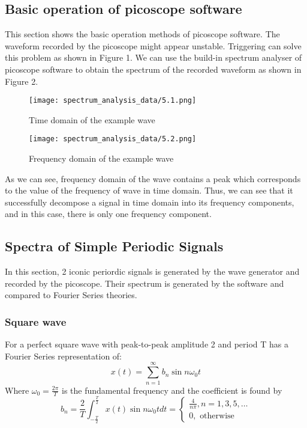 \documentclass[12pt]{article}[times]
\begin{document}
\subsection{Basic operation of picoscope software}
This section shows the basic operation methods of picoscope software. 
The waveform recorded by the picoscope might appear unstable. Triggering
can solve this problem as shown in Figure 1.
We can use the build-in spectrum analyser of picoscope software to 
obtain the spectrum of the recorded waveform as shown in Figure 2.
\noindent %
\begin{figure}[h]
  \centering
  \begin{minipage}{0.45\textwidth}
    \texttt{[image: spectrum\_analysis\_data/5.1.png]}
    \caption{Time domain of the example wave}
    \label{fig:image1}
  \end{minipage}
  \hfill %
  \begin{minipage}{0.45\textwidth}
    \texttt{[image: spectrum\_analysis\_data/5.2.png]}
    \caption{Frequency domain of the example wave}
    \label{fig:image2}
  \end{minipage}
\end{figure}
\newline
As we can see, frequency domain of the wave contains a peak which corresponds
to the value of the frequency of wave in time domain. 
Thus, we can see that it successfully decompose a signal in time domain
into its frequency components, and in this case, there is only one 
frequency component.

\subsection{Spectra of Simple Periodic Signals}
In this section, 2 iconic periordic signals is generated by the wave generator
and recorded by the picoscope. Their spectrum is generated by the software 
and compared to Fourier Series theories.
\subsubsection{Square wave}
For a perfect square wave with peak-to-peak amplitude 2 and period T 
has a Fourier Series representation of:
\begin{equation}
    x(t) = \sum^{\infty}_{n=1} b_n \sin{n\omega_0 t}
\end{equation}
Where $\omega_0 = \frac{2\pi}{T}$ is the fundamental frequency and 
the coefficient is found by 
\begin{equation}
    b_n = \frac{2}{T}\int^{\frac{T}{2}}_{-\frac{T}{2}}x(t)\sin{n\omega_0 t}dt =
    \begin{cases}
      \frac{4}{n\pi}, n = 1, 3, 5, \dots \\
      0, \text{ otherwise}
    \end{cases}
\end{equation}
\end{document}
